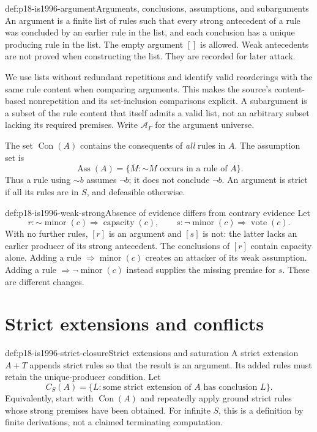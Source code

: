 \begin{hbdefinition}{def:p18-is1996-argument}{Arguments, conclusions, assumptions, and subarguments}
An argument is a finite list of rules such that every strong
antecedent of a rule was concluded by an earlier rule in the list,
and each conclusion has a unique producing rule in the list.
The empty argument \([]\) is allowed.
Weak antecedents are not proved when constructing the list.
They are recorded for later attack.

We use lists without redundant repetitions and identify valid
reorderings with the same rule content when comparing arguments.
This makes the source's content-based nonrepetition and its
set-inclusion comparisons explicit.
A subargument is a subset of the rule content that itself admits
a valid list, not an arbitrary subset lacking its required premises.
Write \(\mathcal A_\Gamma\) for the argument universe.

The set \(\operatorname{Con}(A)\) contains the consequents of
\emph{all} rules in \(A\).
The assumption set is
\[
\operatorname{Ass}(A)=
\{\overline M:\mathord{\sim}M\text{ occurs in a rule of }A\}.
\]
Thus a rule using \(\mathord{\sim}b\) assumes \(\neg b\);
it does not conclude \(\neg b\).
An argument is strict if all its rules are in \(S\), and
defeasible otherwise.
\end{hbdefinition}

\begin{hbexample}{def:p18-is1996-weak-strong}{Absence of evidence differs from contrary evidence}
Let
\[
r:\mathord{\sim}\operatorname{minor}(c)\Rightarrow
       \operatorname{capacity}(c),\qquad
s:\neg\operatorname{minor}(c)\Rightarrow\operatorname{vote}(c).
\]
With no further rules, \([r]\) is an argument and \([s]\) is not:
the latter lacks an earlier producer of its strong antecedent.
The conclusions of \([r]\) contain capacity alone.
Adding a rule \(\Rightarrow\operatorname{minor}(c)\) creates
an attacker of its weak assumption. Adding a rule
\(\Rightarrow\neg\operatorname{minor}(c)\) instead supplies the
missing premise for \(s\). These are different changes.
\end{hbexample}

\section{Strict extensions and conflicts}

\begin{hbdefinition}{def:p18-is1996-strict-closure}{Strict extensions and saturation}
A strict extension \(A+T\) appends strict rules so that the result
is an argument. Its added rules must retain the unique-producer
condition. Let
\[
C_S(A)=\{L:\text{some strict extension of }A
                    \text{ has conclusion }L\}.
\]
Equivalently, start with \(\operatorname{Con}(A)\) and repeatedly
apply ground strict rules whose strong premises have been obtained.
For infinite \(S\), this is a definition by finite derivations,
not a claimed terminating computation.
\end{hbdefinition}

